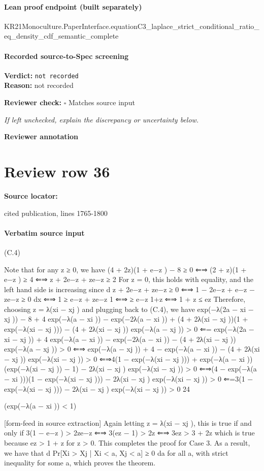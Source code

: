 \documentclass[10pt]{article}
\newcommand{\reviewerbox}{%
  \par\noindent\fbox{\parbox{0.96\linewidth}{\rule{0pt}{0.38in}}}\par
}
\newcommand{\reviewmatch}[1]{%
  \par\noindent\textbf{Reviewer check:} $\square$\; #1\par
  \noindent\emph{If left unchecked, explain the discrepancy or uncertainty below.}\par
}
\begin{document}
\paragraph{Lean proof endpoint (built separately)}\begin{ReviewVerbatim}
KR21Monoculture.PaperInterface.equationC3_laplace_strict_conditional_ratio_eq_density_cdf_semantic_complete
\end{ReviewVerbatim}

\paragraph{Recorded source-to-Spec screening}
\textbf{Verdict:} \texttt{not recorded}
\\
\textbf{Reason:} not recorded
\reviewmatch{Matches source input}
\noindent\textbf{Reviewer annotation}\par
\reviewerbox
\clearpage
\hypertarget{source-claim-29d2b7baa5996f3d}{}
\section*{Review row 36}
\textbf{Source locator:} {\footnotesize\raggedright cited publication, lines 1765-\allowbreak{}1800\par}
\paragraph{Verbatim source input}
\begin{ReviewVerbatim}
(C.4)

Note that for any z ≥ 0, we have
(4 + 2z)(1 + e−z ) − 8 ≥ 0 ⇐⇒ (2 + z)(1 + e−z ) ≥ 4
⇐⇒ z + 2e−z + ze−z ≥ 2
For z = 0, this holds with equality, and the left hand side is increasing since
d
z + 2e−z + ze−z ≥ 0 ⇐⇒ 1 − 2e−z + e−z − ze−z ≥ 0
dx
⇐⇒ 1 ≥ e−z + ze−z
1
⇐⇒
≥ e−z
1+z
⇐⇒ 1 + z ≤ ez
Therefore, choosing z = λ(xi − xj ) and plugging back to (C.4), we have
exp(−λ(2a − xi − xj )) − 8 + 4 exp(−λ(a − xi )) − exp(−2λ(a − xi ))
+ (4 + 2λ(xi − xj ))(1 + exp(−λ(xi − xj ))) − (4 + 2λ(xi − xj )) exp(−λ(a − xj )) > 0
⇐= exp(−λ(2a − xi − xj )) + 4 exp(−λ(a − xi )) − exp(−2λ(a − xi )) − (4 + 2λ(xi − xj )) exp(−λ(a − xj )) > 0
⇐⇒ exp(−λ(a − xj )) + 4 − exp(−λ(a − xi )) − (4 + 2λ(xi − xj )) exp(−λ(xi − xj )) > 0
⇐⇒4(1 − exp(−λ(xi − xj ))) + exp(−λ(a − xi ))(exp(−λ(xi − xj )) − 1) − 2λ(xi − xj ) exp(−λ(xi − xj )) > 0
⇐⇒(4 − exp(−λ(a − xi )))(1 − exp(−λ(xi − xj ))) − 2λ(xi − xj ) exp(−λ(xi − xj )) > 0
⇐=3(1 − exp(−λ(xi − xj ))) − 2λ(xi − xj ) exp(−λ(xi − xj )) > 0
24

(exp(−λ(a − xi )) < 1)


[form-feed in source extraction]
Again letting z = λ(xi − xj ), this is true if and only if
3(1 − e−z ) > 2ze−z ⇐⇒ 3(ez − 1) > 2z
⇐⇒ 3ez > 3 + 2z
which is true because ez > 1 + z for z > 0. This completes the proof for Case 3.
As a result, we have that
d
Pr[Xi > Xj | Xi < a, Xj < a] ≥ 0
da
for all a, with strict inequality for some a, which proves the theorem.
\end{ReviewVerbatim}
\end{document}
